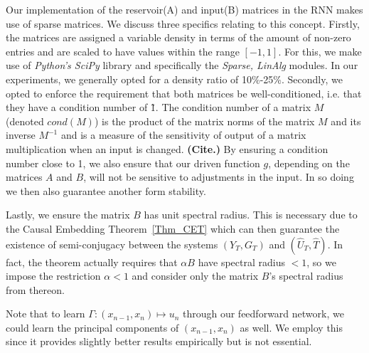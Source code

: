Our implementation of the reservoir(A) and input(B) matrices in the RNN makes use of sparse matrices. We discuss three specifics relating to this concept. Firstly, the matrices are assigned a variable density in terms of the amount of non-zero entries and are scaled to have values within the range $[-1,1]$. For this, we make use of \textit{Python's SciPy} library and specifically the \textit{Sparse, LinAlg} modules. In our experiments, we generally opted for a density ratio of 10\%-25\%.
Secondly, we opted to enforce the requirement that both matrices be well-conditioned, i.e. that they have a condition number of \~1. The condition number of a matrix $M$ (denoted $cond(M)$) is the product of the matrix norms of the matrix $M$ and its inverse $M^{-1}$ and is a measure of the sensitivity of output of a matrix multiplication when an input is changed. \textbf{(Cite.)} By ensuring a condition number close to 1, we also ensure that our driven function $g$, depending on the matrices $A$ and $B$, will not be sensitive to adjustments in the input. In so doing we then also guarantee another form stability. 

Lastly, we ensure the matrix $B$ has unit spectral radius. This is necessary due to the Causal Embedding Theorem~\ref{Thm_CET} which can then guarantee the existence of semi-conjugacy between the systems $(Y_T, G_T)$ and $(\widehat{U}_T, \widehat{T})$. In fact, the theorem actually requires that $\alpha{B}$ have spectral radius $<1$, so we impose the restriction $\alpha<1$ and consider only the matrix $B$'s spectral radius from thereon.


Note that to learn $\Gamma: (x_{n-1},x_{n}) \mapsto u_n$ through our feedforward network, we could learn the principal components of $(x_{n-1},x_{n})$ as well. 
We employ this since it provides slightly better results empirically but is not essential.

